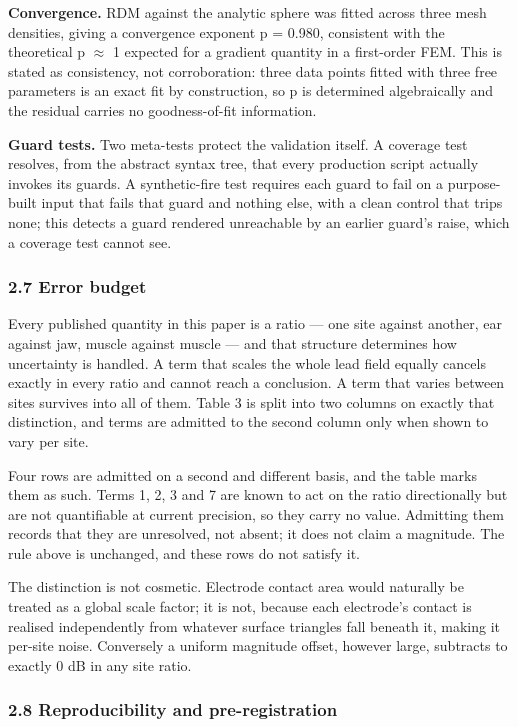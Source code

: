 \documentclass[
  11pt,
  a4paper,
]{article}
\newcounter{none} %
\begin{document}
\textbf{Convergence.} RDM against the analytic sphere was fitted across three mesh
densities, giving a convergence exponent p = 0.980, consistent with the
theoretical p $\approx$ 1 expected for a gradient quantity in a first-order FEM. This is
stated as consistency, not corroboration: three data points fitted with three
free parameters is an exact fit by construction, so p is determined
algebraically and the residual carries no goodness-of-fit information.

\textbf{Guard tests.} Two meta-tests protect the validation itself. A coverage test
resolves, from the abstract syntax tree, that every production script actually
invokes its guards. A synthetic-fire test requires each guard to fail on a
purpose-built input that fails that guard and nothing else, with a clean control
that trips none; this detects a guard rendered unreachable by an earlier guard's
raise, which a coverage test cannot see.

\subsubsection{2.7 Error budget}\label{error-budget}

Every published quantity in this paper is a ratio --- one site against another,
ear against jaw, muscle against muscle --- and that structure determines how
uncertainty is handled. A term that scales the whole lead field equally cancels
exactly in every ratio and cannot reach a conclusion. A term that varies between
sites survives into all of them. Table 3 is split into two columns on exactly
that distinction, and terms are admitted to the second column only when shown to
vary per site.

Four rows are admitted on a second and different basis, and the table marks them
as such. Terms 1, 2, 3 and 7 are known to act on the ratio directionally but are
not quantifiable at current precision, so they carry no value. Admitting them
records that they are unresolved, not absent; it does not claim a
magnitude. The rule above is unchanged, and these rows do not satisfy it.

The distinction is not cosmetic. Electrode contact area would naturally be
treated as a global scale factor; it is not, because each electrode's contact is
realised independently from whatever surface triangles fall beneath it, making
it per-site noise. Conversely a uniform magnitude offset, however large,
subtracts to exactly 0 dB in any site ratio.

\subsubsection{2.8 Reproducibility and pre-registration}\label{reproducibility-and-pre-registration}
\end{document}
